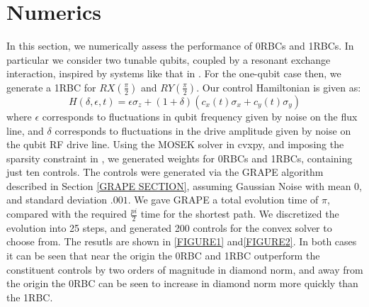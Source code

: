 \documentclass[aps,nofootinbib,pra,notitlepage,twocolumn]{revtex4-1}
\begin{document}
\section{Numerics}
In this section, we numerically assess the performance of 0RBCs and 1RBCs. In particular we consider two tunable qubits, coupled by a resonant exchange interaction, inspired by systems like that in \cite{https://arxiv.org/pdf/1604.03076.pdf}.  For the one-qubit case then, we generate a 1RBC for $RX(\frac{\pi}{2})$ and $RY(\frac{\pi}{2})$. Our control Hamiltonian is given as:
\begin{equation}\label{eq:1Qham}
  H(\delta, \epsilon, t) = \epsilon\sigma_z + (1 + \delta)(c_x(t)\sigma_x + c_y(t)\sigma_y)
\end{equation}
where $\epsilon$ corresponds to fluctuations in qubit frequency given by noise on the flux line, and $\delta$ corresponds to fluctuations in the drive amplitude given by noise on the qubit RF drive line. Using the MOSEK solver in cvxpy, and imposing the sparsity constraint in \cite{SPARTSITY}, we generated weights for 0RBCs and 1RBCs, containing just ten controls. The controls were generated via the GRAPE algorithm described in Section \ref{GRAPE SECTION}, assuming Gaussian Noise with mean 0, and standard deviation $.001$. We gave GRAPE a total evolution time of $\pi$, compared with the required $\frac{pi}{2}$ time for the shortest path. We discretized the evolution into 25 steps, and generated 200 controls for the convex solver to choose from. The resutls are shown in \ref{FIGURE1}  and\ref{FIGURE2}. In both cases it can be seen that near the origin the 0RBC and 1RBC outperform the constituent controls by two orders of magnitude in diamond norm, and away from the origin the 0RBC can be seen to increase in diamond norm more quickly than the 1RBC. 
\end{document}
